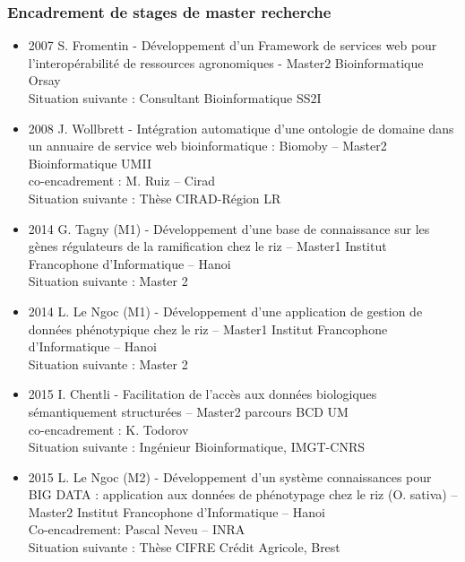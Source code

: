 
\subsubsection*{Encadrement de stages de master recherche}

\begin{itemize}
\item 2007 S. Fromentin - Développement d’un Framework de services web pour l’interopérabilité de ressources agronomiques - Master2 Bioinformatique Orsay\\
Situation suivante : Consultant Bioinformatique SS2I

\item 2008 J. Wollbrett - Intégration automatique d’une ontologie de domaine dans un annuaire de service web bioinformatique : Biomoby – Master2 Bioinformatique UMII\\
co-encadrement : M. Ruiz – Cirad\\
Situation suivante : Thèse CIRAD-Région LR

\item 2014 G. Tagny (M1) - Développement d’une base de connaissance sur les gènes régulateurs de la ramification chez le riz – Master1 Institut Francophone d’Informatique – Hanoi \\
Situation suivante : Master 2

\item 2014 L. Le Ngoc (M1) - Développement d’une application de gestion de données phénotypique chez le riz – Master1 Institut Francophone d’Informatique – Hanoi \\
Situation suivante : Master 2

\item 2015 I. Chentli - Facilitation de l'accès aux données biologiques sémantiquement structurées – Master2 parcours BCD UM \\
co-encadrement : K. Todorov \\
Situation suivante : Ingénieur Bioinformatique, IMGT-CNRS

\item 2015 L. Le Ngoc (M2) - Développement d’un système connaissances pour BIG DATA : application aux données de phénotypage chez le riz (O. sativa) – Master2 Institut Francophone d’Informatique – Hanoi \\
Co-encadrement: 	Pascal Neveu – INRA \\
Situation suivante : Thèse CIFRE Crédit Agricole, Brest


\end{itemize}
